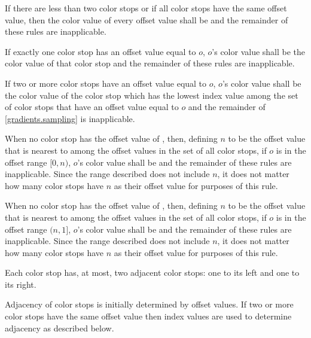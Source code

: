 \begin{enumeratea}
\item If there are less than two color stops or if all color stops have the same offset value, then the color value of every offset value shall be  and the remainder of these rules are inapplicable.

\item If exactly one color stop has an offset value equal to $o$, $o$'s color value shall be the color value of that color stop and the remainder of these rules are inapplicable.

\item If two or more color stops have an offset value equal to $o$, $o$'s color value shall be the color value of the color stop which has the lowest index value among the set of color stops that have an offset value equal to $o$ and the remainder of \ref{gradients.sampling} is inapplicable.

\item When no color stop has the offset value of , then, defining $n$ to be the offset value that is nearest to  among the offset values in the set of all color stops, if $o$ is in the offset range $[0, n)$, $o$'s color value shall be  and the remainder of these rules are inapplicable.
\enternote
Since the range described does not include $n$, it does not matter how many color stops have $n$ as their offset value for purposes of this rule.
\exitnote

\item When no color stop has the offset value of , then, defining $n$ to be the offset value that is nearest to  among the offset values in the set of all color stops, if $o$ is in the offset range $(n, 1]$, $o$'s color value shall be  and the remainder of these rules are inapplicable.
\enternote
Since the range described does not include $n$, it does not matter how many color stops have $n$ as their offset value for purposes of this rule.
\exitnote

\item Each color stop has, at most, two adjacent color stops: one to its left and one to its right.

\item Adjacency of color stops is initially determined by offset values. If two or more color stops have the same offset value then index values are used to determine adjacency as described below.


\end{enumeratea}
